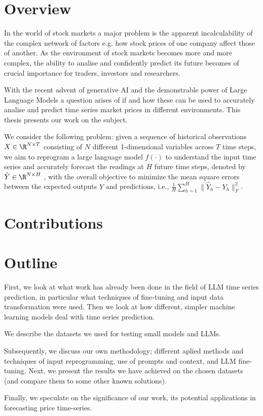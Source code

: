 \section{Overview}
In the world of stock markets a major problem is the apparent incalculability of the complex network of factors e.g. how stock prices of one company affect those of another. As the environment of stock markets becomes more and more complex, the ability to analise and confidently predict its future becomes of crucial importance for traders, investors and researchers.

With the recent advent of generative AI and the demonstrable power of Large Language Models a question arises of if and how these can be used to accurately analise and predict time series market prices in different environments. This thesis presents our work on the subject.

We consider the following problem: given a sequence of historical observations \(X \in \R^{N\times T}\)
consisting of \(N\) different 1-dimensional variables across \(T\) time steps, we aim to reprogram a large
language model \(f(\cdot)\) to understand the input time series and accurately forecast the readings at \(H\) future time steps, denoted by \(\hat{Y} \in \R^{N\times H}\) , with the overall objective to minimize the mean square errors between the expected outputs \(Y\) and predictions, i.e., \(\frac1H \sum_{h=1}^H \| \hat{Y}_h - Y_h \|_F^2 \).

\section{Contributions}
\section{Outline}
First, we look at what work has already been done in the field of LLM time series prediction, in particular what techniques of fine-tuning and input data transformation were used. Then we look at how different, simpler machine learning models deal with time series prediction.

We describe the datasets we used for testing small models and LLMs.

Subsequently, we discuss our own methodology; different aplied methods and techniques of input reprogramming, use of prompts and context, and LLM fine-tuning. Next, we present the results we have achieved on the chosen datasets (and compare them to some other known solutions).

Finally, we speculate on the significance of our work, its potential applications in forecasting price time-series.
